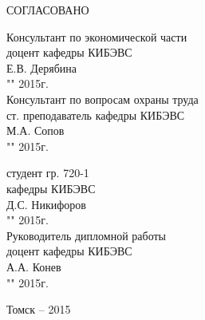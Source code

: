 \begin{singlespace}
 \begin{minipage}{0.48\linewidth}
 СОГЛАСОВАНО
 
 Консультант по экономической части\\
 доцент кафедры КИБЭВС \\
 \underline{\hspace{2.5cm}}Е.В. Дерябина \\
 "\underline{\hspace{1cm}}"\underline{\hspace{3cm}} 2015г.\\

 Консультант по вопросам охраны труда\\
 ст. преподаватель кафедры КИБЭВС \\
 \underline{\hspace{2.5cm}}М.А. Сопов \\
 "\underline{\hspace{1cm}}"\underline{\hspace{3cm}} 2015г.\\
 \end{minipage}
 \hfill
 \begin{minipage}{0.42\linewidth}
 студент гр. 720-1 \\
 кафедры КИБЭВС \\
 \underline{\hspace{2.5cm}}Д.С. Никифоров \\
 "\underline{\hspace{1cm}}"\underline{\hspace{3cm}} 2015г.\\
 
 Руководитель дипломной работы \\
 доцент кафедры КИБЭВС \\
 \underline{\hspace{2.5cm}}А.А. Конев \\
 "\underline{\hspace{1cm}}"\underline{\hspace{3cm}} 2015г.\\
 \end{minipage}
\end{singlespace}

\vfill
\begin{center}
Томск -- 2015
\end{center}